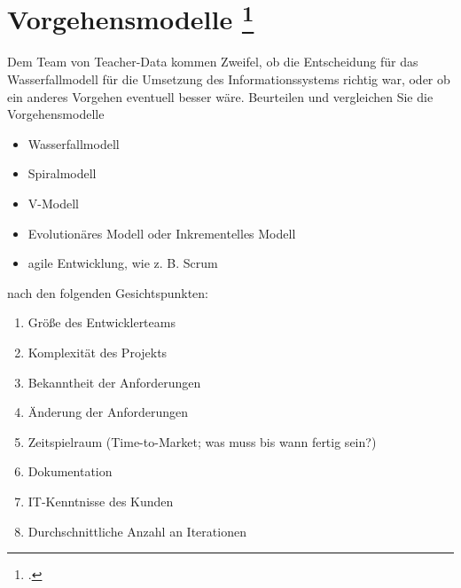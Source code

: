 \documentclass{lehramt-informatik-aufgabe}
\begin{document}
%

\section{Vorgehensmodelle
\footcite[Seite 2]{sosy:ab:1}}

Dem Team von Teacher-Data kommen Zweifel, ob die Entscheidung für das
Wasserfallmodell für die Umsetzung des Informationssystems richtig war,
oder ob ein anderes Vorgehen eventuell besser wäre. Beurteilen und
vergleichen Sie die Vorgehensmodelle

\begin{itemize}
\item Wasserfallmodell
\item Spiralmodell
\item V-Modell
\item Evolutionäres Modell oder
Inkrementelles Modell
\item agile Entwicklung, wie z. B. Scrum
\end{itemize}

\noindent
nach den folgenden Gesichtspunkten:

\begin{enumerate}
\item Größe des Entwicklerteams
\item Komplexität des Projekts
\item Bekanntheit der Anforderungen
\item Änderung der Anforderungen
\item Zeitspielraum (Time-to-Market; was muss bis wann fertig sein?)
\item Dokumentation
\item IT-Kenntnisse des Kunden
\item Durchschnittliche Anzahl an Iterationen
\end{enumerate}
\end{document}
